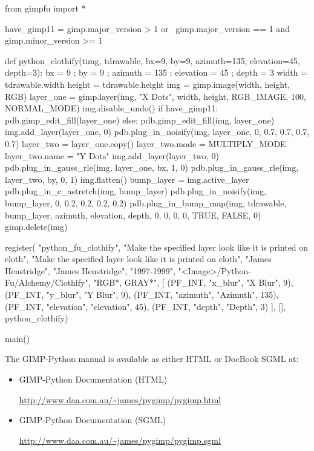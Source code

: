 \documentclass[twoside,11pt]{starlink}
\begin{document}
\begin{small}
\begin{terminalv}
from gimpfu import *

have_gimp11 = gimp.major_version > 1 or \
              gimp.major_version == 1 and gimp.minor_version >= 1

def python_clothify(timg, tdrawable, bx=9, by=9,
                    azimuth=135, elevation=45, depth=3):
        bx = 9 ; by = 9 ; azimuth = 135 ; elevation = 45 ; depth = 3
        width = tdrawable.width
        height = tdrawable.height
        img = gimp.image(width, height, RGB)
        layer_one = gimp.layer(img, "X Dots", width, height, RGB_IMAGE,
                               100, NORMAL_MODE)
        img.disable_undo()
        if have_gimp11:
                pdb.gimp_edit_fill(layer_one)
        else:
                pdb.gimp_edit_fill(img, layer_one)
        img.add_layer(layer_one, 0)
        pdb.plug_in_noisify(img, layer_one, 0, 0.7, 0.7, 0.7, 0.7)
        layer_two = layer_one.copy()
        layer_two.mode = MULTIPLY_MODE
        layer_two.name = "Y Dots"
        img.add_layer(layer_two, 0)
        pdb.plug_in_gauss_rle(img, layer_one, bx, 1, 0)
        pdb.plug_in_gauss_rle(img, layer_two, by, 0, 1)
        img.flatten()
        bump_layer = img.active_layer
        pdb.plug_in_c_astretch(img, bump_layer)
        pdb.plug_in_noisify(img, bump_layer, 0, 0.2, 0.2, 0.2, 0.2)
        pdb.plug_in_bump_map(img, tdrawable, bump_layer, azimuth,
                             elevation, depth, 0, 0, 0, 0, TRUE, FALSE, 0)
        gimp.delete(img)

register(
        "python_fu_clothify",
        "Make the specified layer look like it is printed on cloth",
        "Make the specified layer look like it is printed on cloth",
        "James Henstridge",
        "James Henstridge",
        "1997-1999",
        "<Image>/Python-Fu/Alchemy/Clothify",
        "RGB*, GRAY*",
        [
                (PF_INT, "x_blur", "X Blur", 9),
                (PF_INT, "y_blur", "Y Blur", 9),
                (PF_INT, "azimuth", "Azimuth", 135),
                (PF_INT, "elevation", "elevation", 45),
                (PF_INT, "depth", "Depth", 3)
        ],
        [],
        python_clothify)

main()
\end{terminalv}
\end{small}

The GIMP-Python manual is available as either HTML or DocBook SGML at:

\begin{itemize}
\item {GIMP-Python Documentation (HTML)}\\
\begin{small}\url{http://www.daa.com.au/~james/pygimp/pygimp.html}\end{small}
\item {GIMP-Python Documentation (SGML)}\\
\begin{small}\url{http://www.daa.com.au/~james/pygimp/pygimp.sgml}\end{small}
\end{itemize}
\end{document}
